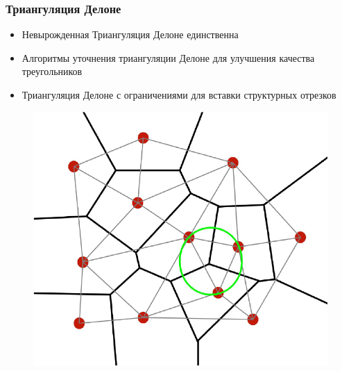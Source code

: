\documentclass[10pt, unicode]{beamer}
\begin{document}
    \begin{frame}
        \frametitle{Триангуляция Делоне}
        \begin{itemize}
            \item Невырожденная Триангуляция Делоне единственна
            \item Алгоритмы уточнения триангуляции Делоне для улучшения качества треугольников
            \item Триангуляция Делоне с ограничениями для вставки структурных отрезков
        \end{itemize}
        \begin{figure}
            \centering
            \includegraphics[scale=0.25]{DelaunayAndVoronoi.png}
        \end{figure}
    \end{frame}
\end{document}
